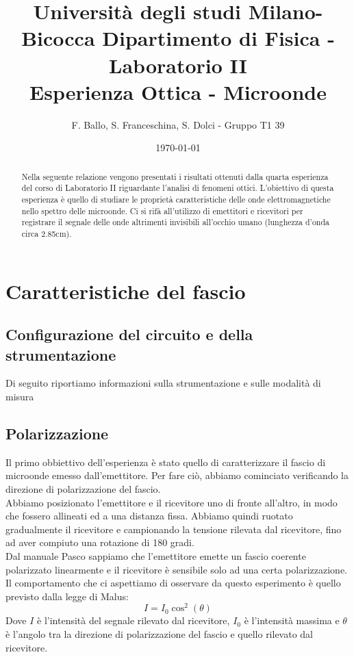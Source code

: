 \documentclass[letterpaper,12pt]{article}
\begin{document}
\title{{\small Università degli studi Milano-Bicocca  Dipartimento di Fisica - Laboratorio II }\\
    Esperienza Ottica - Microonde}
\author{F. Ballo, S. Franceschina, S. Dolci - Gruppo T1 39}
\date{\today}
\maketitle
\thispagestyle{logoheader}


\begin{abstract}
Nella seguente relazione vengono presentati i risultati ottenuti dalla quarta esperienza del corso di Laboratorio II riguardante l'analisi di fenomeni ottici. L'obiettivo di questa esperienza è quello di studiare le proprietà caratteristiche delle onde elettromagnetiche nello spettro delle microonde. Ci si rifà all'utilizzo di emettitori e ricevitori per registrare il segnale delle onde altrimenti invisibili all'occhio umano (lunghezza d'onda circa 2.85cm).  
\begin{adjustwidth}{-1cm}{-1cm}
\end{adjustwidth}
\end{abstract}
\tableofcontents
\newpage

\section{Caratteristiche del fascio}

\subsection{Configurazione del circuito e della strumentazione}
Di seguito riportiamo informazioni sulla strumentazione e sulle modalità di misura

\subsection{Polarizzazione}

Il primo obbiettivo dell'esperienza è stato quello di caratterizzare il fascio di microonde emesso dall'emettitore.
Per fare ciò, abbiamo cominciato verificando la direzione di polarizzazione del fascio. \\
Abbiamo posizionato l'emettitore e il ricevitore uno di fronte all'altro, in modo che fossero
allineati ed a una distanza fissa. Abbiamo quindi ruotato gradualmente il ricevitore e campionando
la tensione rilevata dal ricevitore, fino ad aver compiuto una rotazione di 180 gradi.\\
Dal manuale Pasco sappiamo che l'emettitore emette un fascio coerente polarizzato linearmente
e il ricevitore è sensibile solo ad una certa polarizzazione. Il comportamento che ci aspettiamo
di osservare da questo esperimento è quello previsto dalla legge di Malus:
\begin{equation}
    I = I_0 \cos^2(\theta)
    \label{eq:malus}
\end{equation}
Dove $I$ è l'intensità del segnale rilevato dal ricevitore, $I_0$ è l'intensità massima e $\theta$ è l'angolo
tra la direzione di polarizzazione del fascio e quello rilevato dal ricevitore.\\
\end{document}
